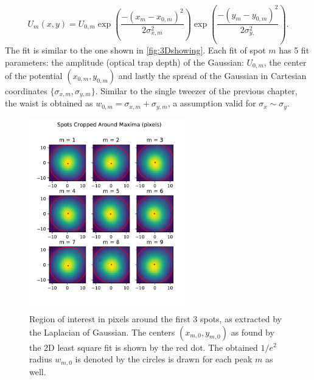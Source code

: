 \begin{equation}\label{eq:2DGaussianNumberK}
    U_m(x,y) = U_{0,m}\exp{\left(\frac{-(x_m-x_{0,m})^2}{2\sigma_{x,m}^2}\right)}
    \exp{\left( \frac{-(y_m-y_{0,m})^2}{2\sigma_{y,}^2} \right)}.
\end{equation}
The fit is similar to the one shown in \cref{fig:3Dshowing}.
Each fit of spot $m$ has 5 fit parameters: the amplitude (optical trap depth) of the Gaussian: $U_{0,m}$, the center of the potential $(x_{0,m}, y_{0,m})$ and lastly the spread of the Gaussian in Cartesian coordinates $\{\sigma_{x,m},\sigma_{y,m}\}$.
Similar to the single tweezer of the previous chapter, the waist is obtained as $w_{0,m} = \sigma_{x,m}+\sigma_{y,m}$, a assumption valid for $\sigma_x\sim\sigma_y$.
\begin{figure}
    \centering
    \includegraphics[width=0.62\textwidth]{figures/SpotsCropped_range12.pdf}
    \caption{Region of interest in pixels around the first 3 spots, as extracted by the Laplacian of Gaussian. 
    The centers $(x_{m,0},y_{m,0})$ as found by the 2D least square fit is shown by the red dot. 
    The obtained $1/e^2$ radius $w_{m,0}$ is denoted by the circles is drawn for each peak $m$ as well.}
    \label{fig:SpotsRoI}
\end{figure}

